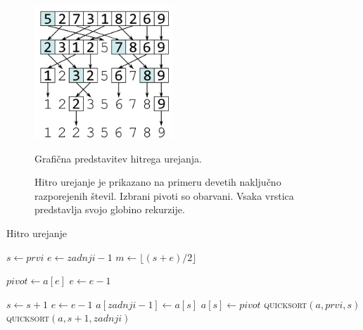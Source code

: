 \documentclass[a4paper,oneside,12pt]{article}
\begin{document}
\begin{figure}[ht]
    \begin{center}
        \includegraphics[height=50mm]{slike/quicksort.pdf}
    \end{center}
    \vspace{-0.6cm}
    \caption[Hitro urejanje]{Grafična predstavitev hitrega urejanja.}
    \caption*{{\small Hitro urejanje je prikazano na primeru devetih naključno razporejenih 
števil. Izbrani pivoti so obarvani. Vsaka vrstica predstavlja svojo globino rekurzije.}}
    \label{fig:quicksortimage}
\end{figure}

\begin{algorithm}[h!t!]
  \caption{Hitro urejanje}\label{algo:quicksort}
  \begin{algorithmic}[1]
         \Return \EndIf
        \State $s \gets prvi$
        \State $e \gets zadnji - 1$
        \State $m \gets \lfloor(s+e)/2\rfloor$
        \EndIf

        \State $pivot \gets a[e]$
        \State $e \gets e - 1$

                \State $s \gets s + 1$
            \EndWhile
                \State $e \gets e - 1$
            \EndWhile
            \EndIf
        \EndWhile
        \State $a[zadnji - 1] \gets a[s]$
        \State $a[s] \gets pivot$
        \State \textsc{quicksort}$(a, prvi, s)$
        \State \textsc{quicksort}$(a, s + 1, zadnji)$
    \EndFunction
  \end{algorithmic}
\end{algorithm}
\end{document}
